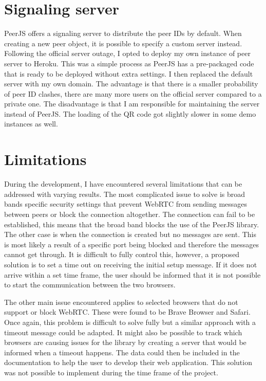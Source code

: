 \documentclass{l4proj}
\begin{document}
\section{Signaling server}
PeerJS offers a signaling server to distribute the peer IDs by default. When creating a new peer object, it is possible to specify a custom server instead. Following the official server outage, I opted to deploy my own instance of peer server to Heroku. This was a simple process as PeerJS has a pre-packaged code that is ready to be deployed without extra settings. I then replaced the default server with my own domain. The advantage is that there is a smaller probability of peer ID clashes, there are many more users on the official server compared to a private one. The disadvantage is that I am responsible for maintaining the server instead of PeerJS. The loading of the QR code got slightly slower in some demo instances as well.

\section{Limitations}
During the development, I have encountered several limitations that can be addressed with varying results. The most complicated issue to solve is broad bands specific security settings that prevent WebRTC from sending messages between peers or block the connection altogether. The connection can fail to be established, this means that the broad band blocks the use of the PeerJS library. The other case is when the connection is created but no messages are sent. This is most likely a result of a specific port being blocked and therefore the messages cannot get through. It is difficult to fully control this, however, a proposed solution is to set a time out on receiving the initial setup message. If it does not arrive within a set time frame, the user should be informed that it is not possible to start the communication between the two browsers. \par 

The other main issue encountered applies to selected browsers that do not support or block WebRTC. These were found to be Brave Browser and Safari. Once again, this problem is difficult to solve fully but a similar approach with a timeout message could be adapted. It might also be possible to track which browsers are causing issues for the library by creating a server that would be informed when a timeout happens. The data could then be included in the documentation to help the user to develop their web application. This solution was not possible to implement during the time frame of the project. \par
\end{document}
